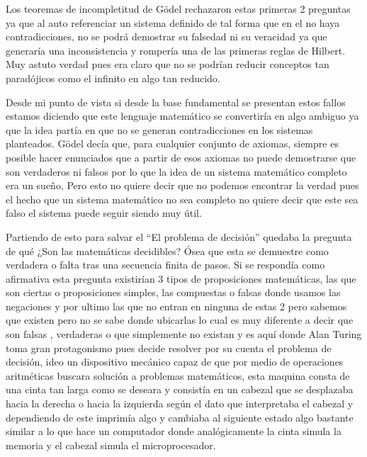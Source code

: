 \documentclass{article}
\begin{document}
\par
Los teoremas de incompletitud de Gödel rechazaron estas primeras 2 preguntas ya que al auto referenciar un sistema definido de tal forma que en el no haya contradicciones, no se podrá demostrar su falsedad ni su veracidad ya que generaría una inconsistencia y rompería una de las primeras reglas de Hilbert. Muy astuto verdad pues era claro que no se podrían reducir conceptos tan paradójicos como el infinito en algo tan reducido. 
\par
\vspace{2mm}
Desde mi punto de vista si desde la base fundamental se presentan estos fallos estamos diciendo que este lenguaje matemático se convertiría en algo ambiguo ya que la idea partía en que no se generan contradicciones en los sistemas planteados. Gödel decía que, para cualquier conjunto de axiomas, siempre es posible hacer enunciados que a partir de esos axiomas no puede demostrarse que son verdaderos ni falsos por lo que la idea de un sistema matemático completo era un sueño, Pero esto no quiere decir que no podemos encontrar la verdad pues el hecho que un sistema matemático no sea completo no quiere decir que este sea falso el sistema puede seguir siendo muy útil. 
\par
\vspace{2mm}
Partiendo de esto para salvar el “El problema de decisión” quedaba la pregunta de qué ¿Son las matemáticas decidibles? Ósea que esta se demuestre como verdadera o falta tras una secuencia finita de pasos. Si se respondía como afirmativa esta pregunta existirían 3 tipos de proposiciones matemáticas, las que son ciertas o proposiciones simples, las compuestas o falsas donde usamos las negaciones y por ultimo las que no entran en ninguna de estas 2 pero sabemos que existen pero no se sabe donde ubicarlas lo cual es muy diferente a decir que son falsas , verdaderas o que simplemente no existan y es aquí donde Alan Turing toma gran protagonismo pues decide resolver por su cuenta el problema de decisión, ideo un dispositivo mecánico capaz de que por medio de operaciones aritméticas buscara solución a problemas matemáticos, esta maquina consta de una cinta tan larga como se deseara y consistía en un cabezal que se desplazaba hacia la derecha o hacia la izquierda según el dato que interpretaba el cabezal y dependiendo de este imprimía algo y cambiaba al siguiente estado  algo bastante similar a lo que hace un computador donde analógicamente la cinta simula la memoria y el cabezal simula el microprocesador.
\par
\end{document}
